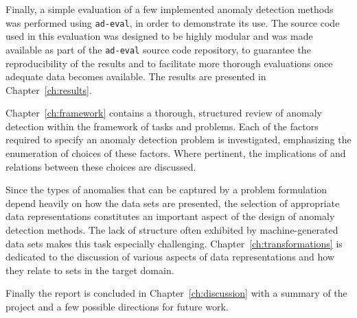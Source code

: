 Finally, a simple evaluation of a few implemented anomaly detection methods was performed using \texttt{ad-eval}, in order to demonstrate its use. The source code used in this evaluation was designed to be highly modular and was made available as part of the \texttt{ad-eval} source code repository, to guarantee the reproducibility of the results and to facilitate more thorough evaluations once adequate data becomes available. The results are presented in Chapter~\ref{ch:results}.

Chapter~\ref{ch:framework} contains a thorough, structured review of anomaly detection within the framework of tasks and problems. Each of the factors required to specify an anomaly detection problem is investigated, emphasizing the enumeration of choices of these factors. Where pertinent, the implications of and relations between these choices are discussed.

Since the types of anomalies that can be captured by a problem formulation depend heavily on how the data sets are presented, the selection of appropriate data representations constitutes an important aspect of the design of anomaly detection methods. The lack of structure often exhibited by machine-generated data sets makes this task especially challenging. Chapter~\ref{ch:transformations} is dedicated to the discussion of various aspects of data representations and how they relate to sets in the target domain. 

Finally the report is concluded in Chapter~\ref{ch:discussion} with a summary of the project and a few possible directions for future work.
